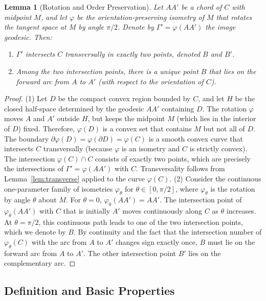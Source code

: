 \documentclass{article}
\newtheorem{lemma}[theorem]{Lemma}
\begin{document}
\begin{lemma}[Rotation and Order Preservation]\label{lem:rotation}
    Let $AA'$ be a chord of $C$ with midpoint $M$, and let $\varphi$ be the orientation-preserving isometry of $M$ that rotates the tangent space at $M$ by angle $\pi/2$. Denote by $\Gamma' = \varphi(AA')$ the image geodesic. Then:
    \begin{enumerate}
        \item $\Gamma'$ intersects $C$ transversally in exactly two points, denoted $B$ and $B'$.
        \item Among the two intersection points, there is a unique point $B$ that lies on the forward arc from $A$ to $A'$ (with respect to the orientation of $C$).
    \end{enumerate}
\end{lemma}
\begin{proof}
    (1) Let $D$ be the compact convex region bounded by $C$, and let $H$ be the closed half-space determined by the geodesic $AA'$ containing $D$. The rotation $\varphi$ moves $A$ and $A'$ outside $H$, but keeps the midpoint $M$ (which lies in the interior of $D$) fixed. Therefore, $\varphi(D)$ is a convex set that contains $M$ but not all of $D$. The boundary $\partial\varphi(D) = \varphi(\partial D) = \varphi(C)$ is a smooth convex curve that intersects $C$ transversally (because $\varphi$ is an isometry and $C$ is strictly convex). The intersection $\varphi(C) \cap C$ consists of exactly two points, which are precisely the intersections of $\Gamma' = \varphi(AA')$ with $C$. Transversality follows from Lemma~\ref{lem:transverse} applied to the curve $\varphi(C)$.
   (2) Consider the continuous one-parameter family of isometries $\varphi_\theta$ for $\theta \in [0, \pi/2]$, where $\varphi_\theta$ is the rotation by angle $\theta$ about $M$. For $\theta=0$, $\varphi_0(AA') = AA'$. The intersection point of $\varphi_\theta(AA')$ with $C$ that is initially $A'$ moves continuously along $C$ as $\theta$ increases. At $\theta=\pi/2$, this continuous path leads to one of the two intersection points, which we denote by $B$. By continuity and the fact that the intersection number of $\varphi_\theta(C)$ with the arc from $A$ to $A'$ changes sign exactly once, $B$ must lie on the forward arc from $A$ to $A'$. The other intersection point $B'$ lies on the complementary arc.
\end{proof}

\subsection{Definition and Basic Properties}
\end{document}
